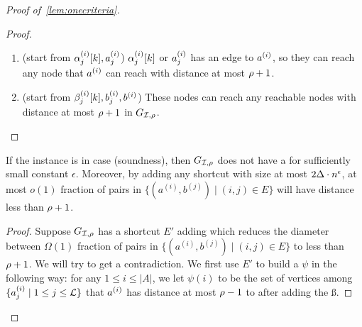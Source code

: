 \begin{proof}[Proof of~\cref{lem:onecriteria}]
\begin{proof}
\begin{enumerate}
			\item (start from $\aaa{i}{j}{k},\aa{i}{j}$) $\aaa{i}{j}{k}$ or $\aa{i}{j}$ has an edge to $\a{i}$, so they can reach any node that $\a{i}$ can reach with distance at most $\dia{}+1$. 
			
			\item (start from $\bbb{i}{j}{k},\bb{i}{j},\b{i}$) These nodes can reach any reachable nodes with distance at most $\dia{}+1$ in $G_{\I,\dia{}}$. 
		\end{enumerate}
		
	\end{proof}
	
	\begin{claim}\label{clai:caseII}
		If the \minre{} instance is in case (soundness), then $G_{\I,\dia{}}$ does not have a  for sufficiently small constant $\epsilon$. Moreover, by adding any shortcut with size at most $2\AB\cdot n^{\epsilon}$, at most $o(1)$ fraction of pairs in $\{(a^{(i)},b^{(j)})\mid (i,j)\in E\}$ will have distance less than $\dia{}+1$. 
	\end{claim}
	\begin{proof}
		Suppose $G_{\I,\dia{}}$ has a shortcut $E'$ adding which reduces the diameter between $\Omega(1)$ fraction of pairs in $\{(a^{(i)},b^{(j)})\mid (i,j)\in E\}$ to less than $\dia{}+1$. We will try to get a contradiction. We first use $E'$ to build a \mlab{} $\psi$ in the following way: for any $1\le i\le |A|$, we let $\psi(i)$ to be the set of vertices among $\{\aa{i}{j}\mid 1\le j\le \L\}$ that $\a{i}$ has distance at most $\dia{}-1$ to after adding the \ss{}. 
		

\end{proof}
\end{proof}
